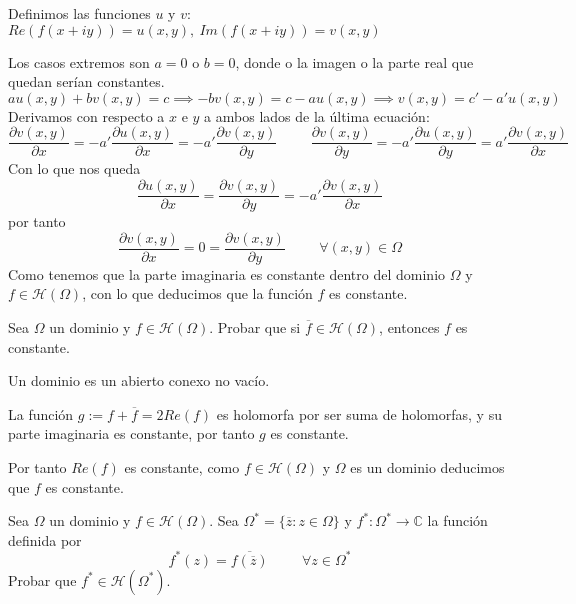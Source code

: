 \begin{sol}

Definimos las funciones $u$ y $v$: 
$Re(f(x+iy)) = u(x,y), \ Im(f(x+iy)) = v(x,y)$

Los casos extremos son $a=0$ o $b=0$, donde o la imagen o la parte real que quedan serían constantes.
$$au(x,y)+bv(x,y)=c \implies -bv(x,y) = c-au(x,y) \implies v(x,y)= c'-a'u(x,y)$$
Derivamos con respecto a $x$ e $y$ a ambos lados de la última ecuación:
$$\frac{\partial v(x,y)}{\partial x} = -a' \frac{\partial u(x,y)}{\partial x} = -a' \frac{\partial v(x,y)}{\partial y} \hspace{1cm} \frac{\partial v(x,y)}{\partial y} = -a' \frac{\partial u(x,y)}{\partial y} = a' \frac{\partial v(x,y)}{\partial x}$$
Con lo que nos queda
$$\frac{\partial u (x,y)}{\partial x} = \frac{\partial v(x,y)}{\partial y} = -a'\frac{\partial v(x,y)}{\partial x}$$
por tanto
$$\frac{\partial v(x,y)}{\partial x} = 0 = \frac{\partial v(x,y)}{\partial y} \hspace{1cm}\forall (x,y)\in\Omega$$
Como tenemos que la parte imaginaria es constante dentro del dominio $\Omega$ y $f\in\mathcal{H}(\Omega)$, con lo que deducimos que la función $f$ es constante.
\end{sol}



\begin{ejer}
	Sea $\Omega$ un dominio y $f\in\mathcal{H}(\Omega)$. Probar que si $\overline{f}\in\mathcal{H}(\Omega)$, entonces $f$ es constante.
\end{ejer}


\begin{sol}
	
Un dominio es un abierto conexo no vacío.

La función $g := f+\overline{f} = 2Re(f)$ es holomorfa por ser suma de holomorfas, y su parte imaginaria es constante, por tanto $g$ es constante.

Por tanto $Re(f)$ es constante, como $f\in\mathcal{H}(\Omega)$ y $ \Omega$ es un dominio deducimos que $f$ es constante.
\end{sol}





\begin{ejer}
	Sea $\Omega$ un dominio y $f\in\mathcal{H}(\Omega)$. Sea $\Omega^{\ast} = \{ \overline{z} : z\in\Omega \}$ y $f^{\ast}:\Omega^{\ast} \rightarrow \mathbb{C}$ la función definida por
	$$ f^{\ast}(z) = \overline{ f(\overline{z} ) } \hspace{1cm} \forall z\in\Omega^{\ast}$$
	Probar que $f^{\ast}\in\mathcal{H}(\Omega^{\ast})$.
\end{ejer}

